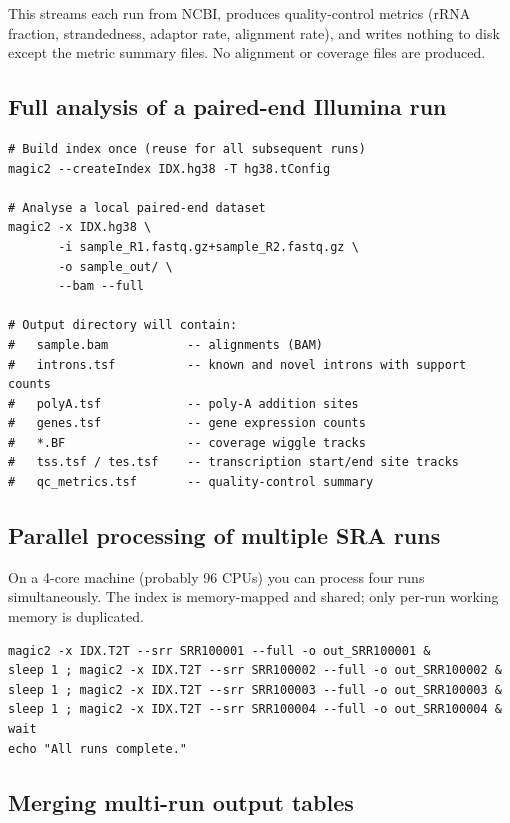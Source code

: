 \documentclass[11pt]{article}
\begin{document}
This streams each run from NCBI, produces quality-control metrics
(rRNA fraction, strandedness, adaptor rate, alignment rate), and
writes nothing to disk except the metric summary files.  No alignment
or coverage files are produced.

\subsection{Full analysis of a paired-end Illumina run}

\begin{lstlisting}
# Build index once (reuse for all subsequent runs)
magic2 --createIndex IDX.hg38 -T hg38.tConfig

# Analyse a local paired-end dataset
magic2 -x IDX.hg38 \
       -i sample_R1.fastq.gz+sample_R2.fastq.gz \
       -o sample_out/ \
       --bam --full

# Output directory will contain:
#   sample.bam           -- alignments (BAM)
#   introns.tsf          -- known and novel introns with support counts
#   polyA.tsf            -- poly-A addition sites
#   genes.tsf            -- gene expression counts
#   *.BF                 -- coverage wiggle tracks
#   tss.tsf / tes.tsf    -- transcription start/end site tracks
#   qc_metrics.tsf       -- quality-control summary
\end{lstlisting}

\subsection{Parallel processing of multiple SRA runs}

On a 4-core machine (probably 96 CPUs) you can process four runs simultaneously.  The
index is memory-mapped and shared; only per-run working memory is
duplicated.

\begin{lstlisting}
magic2 -x IDX.T2T --srr SRR100001 --full -o out_SRR100001 &
sleep 1 ; magic2 -x IDX.T2T --srr SRR100002 --full -o out_SRR100002 &
sleep 1 ; magic2 -x IDX.T2T --srr SRR100003 --full -o out_SRR100003 &
sleep 1 ; magic2 -x IDX.T2T --srr SRR100004 --full -o out_SRR100004 &
wait
echo "All runs complete."
\end{lstlisting}

\subsection{Merging multi-run output tables}
\end{document}
